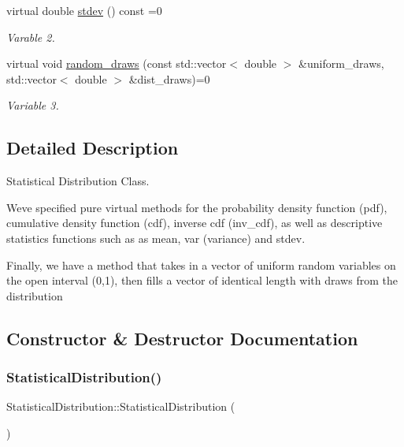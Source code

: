 \begin{DoxyCompactItemize}
virtual double \hyperlink{classStatisticalDistribution_af097e57c0d28489af68ca8a4edaebcac}{stdev} () const =0
\begin{DoxyCompactList}\small\item\em Varable 2. \end{DoxyCompactList}\item 
\mbox{\label{classStatisticalDistribution_affe04d41cb2e6f9526cc2ad4fb5fb150}} 
virtual void \hyperlink{classStatisticalDistribution_affe04d41cb2e6f9526cc2ad4fb5fb150}{random\+\_\+draws} (const std\+::vector$<$ double $>$ \&uniform\+\_\+draws, std\+::vector$<$ double $>$ \&dist\+\_\+draws)=0
\begin{DoxyCompactList}\small\item\em Variable 3. \end{DoxyCompactList}\end{DoxyCompactItemize}


\subsection{Detailed Description}
Statistical Distribution Class. 

We\textquotesingle{}ve specified pure virtual methods for the probability density function (pdf), cumulative density function (cdf), inverse cdf (inv\+\_\+cdf), as well as descriptive statistics functions such as as mean, var (variance) and stdev.

Finally, we have a method that takes in a vector of uniform random variables on the open interval (0,1), then fills a vector of identical length with draws from the distribution 

\subsection{Constructor \& Destructor Documentation}
\mbox{\label{classStatisticalDistribution_a0c968a41a854b3d33310b7bd78a7238a}} 
\subsubsection{\texorpdfstring{Statistical\+Distribution()}{StatisticalDistribution()}}
{\footnotesize\ttfamily Statistical\+Distribution\+::\+Statistical\+Distribution (\begin{DoxyParamCaption}{ }\end{DoxyParamCaption})}



